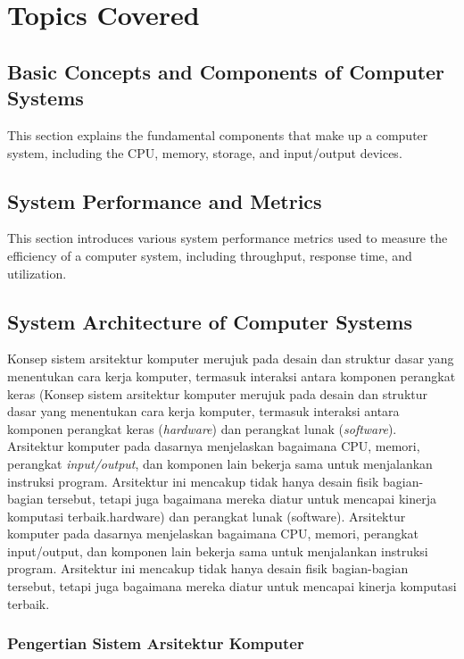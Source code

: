 \documentclass[12pt]{article}
\begin{document}
\section{Topics Covered}

\subsection{Basic Concepts and Components of Computer Systems}
This section explains the fundamental components that make up a computer system, including the CPU, memory, storage, and input/output devices.

\subsection{System Performance and Metrics}
This section introduces various system performance metrics used to measure the efficiency of a computer system, including throughput, response time, and utilization.


\subsection{System Architecture of Computer Systems}


Konsep sistem arsitektur komputer merujuk pada desain dan struktur dasar yang menentukan cara kerja komputer, termasuk interaksi antara komponen perangkat keras (Konsep sistem arsitektur komputer merujuk pada desain dan struktur dasar yang menentukan cara kerja komputer, termasuk interaksi antara komponen perangkat keras (\textit{hardware}) dan perangkat lunak (\textit{software}). Arsitektur komputer pada dasarnya menjelaskan bagaimana CPU, memori, perangkat \textit{input/output}, dan komponen lain bekerja sama untuk menjalankan instruksi program. Arsitektur ini mencakup tidak hanya desain fisik bagian-bagian tersebut, tetapi juga bagaimana mereka diatur untuk mencapai kinerja komputasi terbaik.hardware) dan perangkat lunak (software). Arsitektur komputer pada dasarnya menjelaskan bagaimana CPU, memori, perangkat input/output, dan komponen lain bekerja sama untuk menjalankan instruksi program. Arsitektur ini mencakup tidak hanya desain fisik bagian-bagian tersebut, tetapi juga bagaimana mereka diatur untuk mencapai kinerja komputasi terbaik.

\subsubsection{Pengertian Sistem Arsitektur Komputer}
\end{document}

